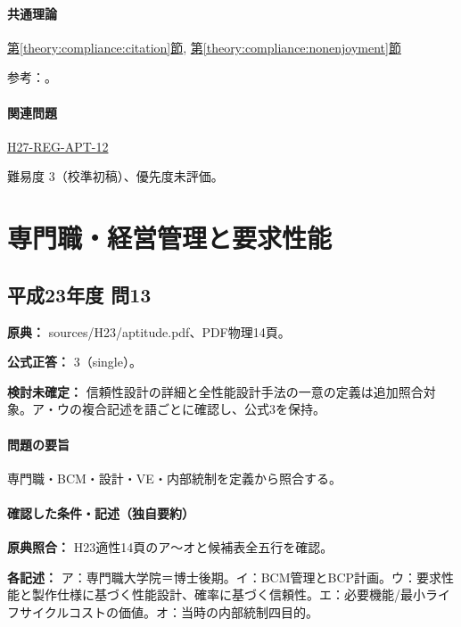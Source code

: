 \paragraph{共通理論} \hyperref[theory:compliance:citation]{第\ref*{theory:compliance:citation}節}, \hyperref[theory:compliance:nonenjoyment]{第\ref*{theory:compliance:nonenjoyment}節}

\par 参考：\cite{bunka_citation_faq,bunka_amend2018,bunka_ai2024,bunka_text2026}。

\paragraph{関連問題} \hyperref[q:h27-reg-apt-12]{H27-REG-APT-12}

\par 難易度 3（校準初稿）、優先度未評価。

\section{専門職・経営管理と要求性能}

\subsection{平成23年度 問13}
\label{q:h23-reg-apt-13}

\noindent\textbf{原典：} sources/H23/aptitude.pdf、PDF物理14頁。

\textbf{公式正答：} 3（single）。

\par\textbf{検討未確定：} 信頼性設計の詳細と全性能設計手法の一意の定義は追加照合対象。ア・ウの複合記述を語ごとに確認し、公式3を保持。

\paragraph{問題の要旨} 専門職・BCM・設計・VE・内部統制を定義から照合する。

\paragraph{確認した条件・記述（独自要約）}\mbox{}\par

\noindent\textbf{原典照合：} H23適性14頁のア〜オと候補表全五行を確認。\par

\noindent\textbf{各記述：} ア：専門職大学院＝博士後期。イ：BCM管理とBCP計画。ウ：要求性能と製作仕様に基づく性能設計、確率に基づく信頼性。エ：必要機能/最小ライフサイクルコストの価値。オ：当時の内部統制四目的。\par

